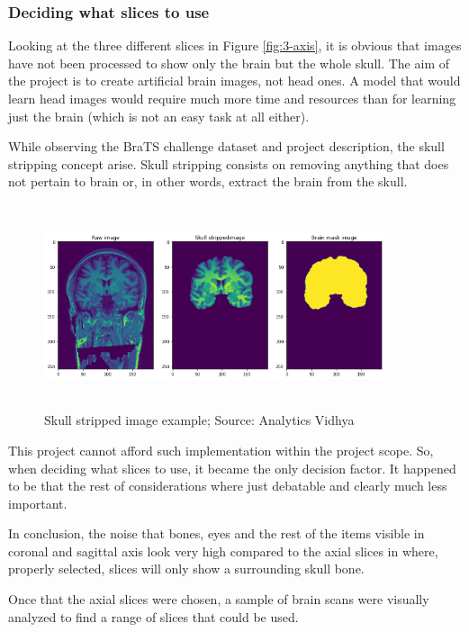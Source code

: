 \subsubsection*{Deciding what slices to use}

Looking at the three different slices in Figure \ref{fig:3-axis}, it is obvious that images have not been processed to show only the brain but the whole skull. The aim of the project is to create artificial brain images, not head ones. A model that would learn head images would require much more time and resources than for learning just the brain (which is not an easy task at all either).

While observing the BraTS \cite{brats} challenge dataset and project description, the skull stripping concept arise. Skull stripping consists on removing anything that does not pertain to brain or, in other words, extract the brain from the skull. 

\begin{figure}[ht]
    \centering
    \includegraphics[width = 10cm, height = 6cm]{images/skull-stripped.png}
    \caption[Skull stripped image example]{Skull stripped image example; Source: Analytics Vidhya \cite{skullstripping} }
    \label{fig:skullstripped}
\end{figure}

This project cannot afford such implementation within the project scope. So, when deciding what slices to use, it became the only decision factor. It happened to be that the rest of considerations where just debatable and clearly much less important.

In conclusion, the noise that bones, eyes and the rest of the items visible in coronal and sagittal axis look very high compared to the axial slices in where, properly selected, slices will only show a surrounding skull bone.

Once that the axial slices were chosen, a sample of brain scans were visually analyzed to find a range of slices that could be used.

